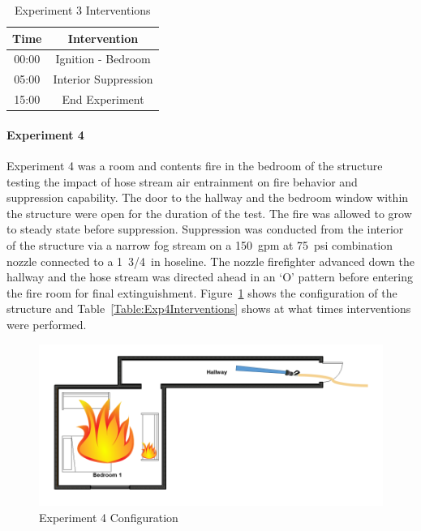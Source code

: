 \documentclass[12pt,oneside]{book}
\begin{document}
\begin{table}[H]
	\centering
	\caption{Experiment 3 Interventions}
	\begin{tabular}{|c|c|} 
		\hline
		Time & Intervention \\ \hline \hline
		00:00 & Ignition - Bedroom \\ \hline
		05:00 & Interior Suppression \\ \hline
		15:00 & End Experiment\\ \hline
	\end{tabular}
	\label{Table:Exp3Interventions}
\end{table}

\clearpage

\paragraph{Experiment 4} \mbox{}

Experiment 4 was a room and contents fire in the bedroom of the structure testing the impact of hose stream air entrainment on fire behavior and suppression capability. The door to the hallway and the bedroom window within the structure were open for the duration of the test. The fire was allowed to grow to steady state before suppression. Suppression was conducted from the interior of the structure via a narrow fog stream on a 150~gpm at 75~psi combination nozzle connected to a 1~3/4~in hoseline. The nozzle firefighter advanced down the hallway and the hose stream was directed ahead in an `O' pattern before entering the fire room for final extinguishment. Figure~\ref{fig:Exp4Config} shows the configuration of the structure and Table~\ref{Table:Exp4Interventions} shows at what times interventions were performed. 


\begin{figure}[H]
	\centering
	\includegraphics[width=5in]{Howard_Exp_4.png}
	\caption{Experiment 4 Configuration}
	\label{fig:Exp4Config}
\end{figure}
\end{document}
